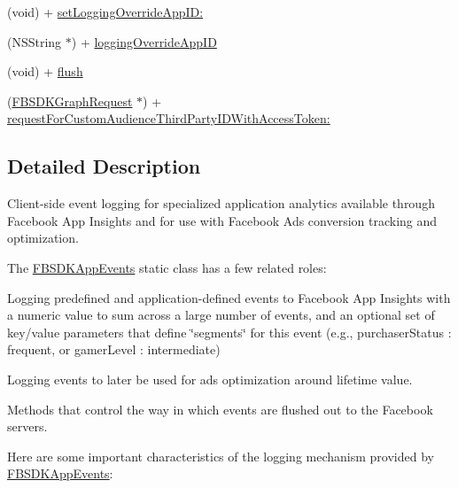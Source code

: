\begin{DoxyCompactItemize}
\item 
(void) + \hyperlink{interface_f_b_s_d_k_app_events_a4ed11c9908b55d7d8dc8b790fb5dda67}{set\+Logging\+Override\+App\+I\+D\+:}
\item 
(N\+S\+String $\ast$) + \hyperlink{interface_f_b_s_d_k_app_events_a49a091e8ee936bb4bfac39fb4fe17c77}{logging\+Override\+App\+I\+D}
\item 
(void) + \hyperlink{interface_f_b_s_d_k_app_events_a29c403bbe9d6a720de1a42f739bba249}{flush}
\item 
(\hyperlink{interface_f_b_s_d_k_graph_request}{F\+B\+S\+D\+K\+Graph\+Request} $\ast$) + \hyperlink{interface_f_b_s_d_k_app_events_a47cb8cd6a8f098aad2c8aaf648f4ce0e}{request\+For\+Custom\+Audience\+Third\+Party\+I\+D\+With\+Access\+Token\+:}
\end{DoxyCompactItemize}


\subsection{Detailed Description}
Client-\/side event logging for specialized application analytics available through Facebook App Insights and for use with Facebook Ads conversion tracking and optimization.

The {\ttfamily \hyperlink{interface_f_b_s_d_k_app_events}{F\+B\+S\+D\+K\+App\+Events}} static class has a few related roles\+:


\begin{DoxyItemize}
\item Logging predefined and application-\/defined events to Facebook App Insights with a numeric value to sum across a large number of events, and an optional set of key/value parameters that define \char`\"{}segments\char`\"{} for this event (e.\+g., \textquotesingle{}purchaser\+Status\textquotesingle{} \+: \textquotesingle{}frequent\textquotesingle{}, or \textquotesingle{}gamer\+Level\textquotesingle{} \+: \textquotesingle{}intermediate\textquotesingle{})
\item Logging events to later be used for ads optimization around lifetime value.
\item Methods that control the way in which events are flushed out to the Facebook servers.
\end{DoxyItemize}

Here are some important characteristics of the logging mechanism provided by {\ttfamily \hyperlink{interface_f_b_s_d_k_app_events}{F\+B\+S\+D\+K\+App\+Events}}\+:


